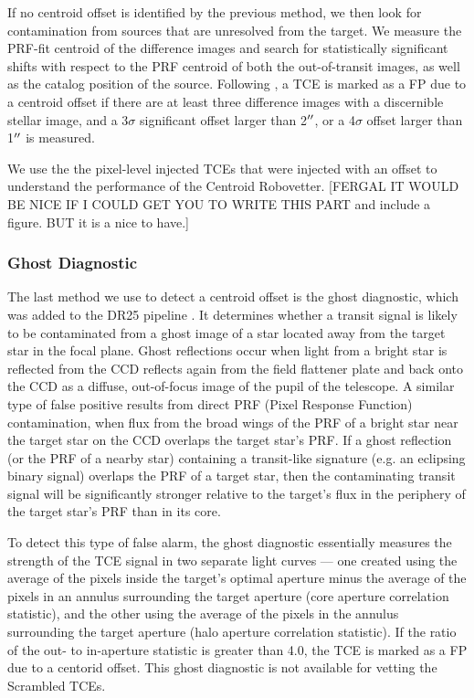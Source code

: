 If no centroid offset is identified by the previous method, we then look for contamination from sources that are unresolved from the target. We measure the PRF-fit centroid of the difference images and search for statistically significant shifts with respect to the PRF centroid of both the out-of-transit images, as well as the catalog position of the source. Following \citet{Bryson2013}, a TCE is marked as a FP due to a centroid offset if there are at least three difference images with a discernible stellar image, and a 3$\sigma$ significant offset larger than 2$\mbox{$^{\prime\prime}$}$, or a 4$\sigma$ offset larger than 1$\mbox{$^{\prime\prime}$}$ is measured.

We use the the pixel-level injected TCEs that were injected with an offset to understand the performance of the Centroid Robovetter.  [FERGAL IT WOULD BE NICE IF I COULD GET YOU TO WRITE THIS PART and include a figure. BUT it is a nice to have.]

\subsubsection{Ghost Diagnostic}
The last method we use to detect a centroid offset is the ghost diagnostic, which was added to the DR25 \kepler{} pipeline \citep{Twicken2016}. It determines whether a transit signal is likely to be contaminated from a ghost image of a star located away from the target star in the focal plane. Ghost reflections occur when light from a bright star is reflected from the CCD reflects again from the field flattener plate and back onto the CCD as a diffuse, out-of-focus image of the pupil of
the telescope. A similar type of false positive results from direct PRF (Pixel Response Function) contamination, when flux from the broad wings of the PRF of a bright star near the target star on the CCD overlaps the target star's PRF.  If a ghost reflection (or the PRF of a nearby star) containing a transit-like signature (e.g. an eclipsing binary signal) overlaps the PRF of a target star, then the contaminating transit signal will be significantly stronger relative to the target's flux in the periphery of the target star's PRF than in its core.


To detect this type of false alarm, the ghost diagnostic essentially measures the strength of the TCE signal in two separate light curves --- one created using the average of the pixels inside the target's optimal aperture minus the average of the pixels in an annulus surrounding the target aperture (core aperture correlation statistic), and the other using the average of the pixels in the annulus surrounding the target aperture (halo aperture correlation statistic). If the ratio of the out- to in-aperture statistic is greater than 4.0, the TCE is marked as a FP due to a centorid offset. This ghost diagnostic is not available for vetting the Scrambled TCEs.  

